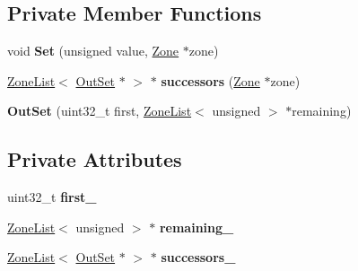 \subsection*{Private Member Functions}
\begin{DoxyCompactItemize}
\item 
void {\bfseries Set} (unsigned value, \hyperlink{classv8_1_1internal_1_1_zone}{Zone} $\ast$zone)\hypertarget{classv8_1_1internal_1_1_out_set_aa374a48dcfd36bf76d9e151f87f0549b}{}\label{classv8_1_1internal_1_1_out_set_aa374a48dcfd36bf76d9e151f87f0549b}

\item 
\hyperlink{classv8_1_1internal_1_1_zone_list}{Zone\+List}$<$ \hyperlink{classv8_1_1internal_1_1_out_set}{Out\+Set} $\ast$ $>$ $\ast$ {\bfseries successors} (\hyperlink{classv8_1_1internal_1_1_zone}{Zone} $\ast$zone)\hypertarget{classv8_1_1internal_1_1_out_set_af4746e8aa3326073ec7b7363dd32cb5b}{}\label{classv8_1_1internal_1_1_out_set_af4746e8aa3326073ec7b7363dd32cb5b}

\item 
{\bfseries Out\+Set} (uint32\+\_\+t first, \hyperlink{classv8_1_1internal_1_1_zone_list}{Zone\+List}$<$ unsigned $>$ $\ast$remaining)\hypertarget{classv8_1_1internal_1_1_out_set_a2dca2035d6464f4c455d179c3fded9fa}{}\label{classv8_1_1internal_1_1_out_set_a2dca2035d6464f4c455d179c3fded9fa}

\end{DoxyCompactItemize}
\subsection*{Private Attributes}
\begin{DoxyCompactItemize}
\item 
uint32\+\_\+t {\bfseries first\+\_\+}\hypertarget{classv8_1_1internal_1_1_out_set_a13673b67ed016856d4a183db2fec123e}{}\label{classv8_1_1internal_1_1_out_set_a13673b67ed016856d4a183db2fec123e}

\item 
\hyperlink{classv8_1_1internal_1_1_zone_list}{Zone\+List}$<$ unsigned $>$ $\ast$ {\bfseries remaining\+\_\+}\hypertarget{classv8_1_1internal_1_1_out_set_ab28370a656afc5c7cb534d092e1d42ec}{}\label{classv8_1_1internal_1_1_out_set_ab28370a656afc5c7cb534d092e1d42ec}

\item 
\hyperlink{classv8_1_1internal_1_1_zone_list}{Zone\+List}$<$ \hyperlink{classv8_1_1internal_1_1_out_set}{Out\+Set} $\ast$ $>$ $\ast$ {\bfseries successors\+\_\+}\hypertarget{classv8_1_1internal_1_1_out_set_abb78704db72e4b9b46322d0e643f9ac9}{}\label{classv8_1_1internal_1_1_out_set_abb78704db72e4b9b46322d0e643f9ac9}

\end{DoxyCompactItemize}
